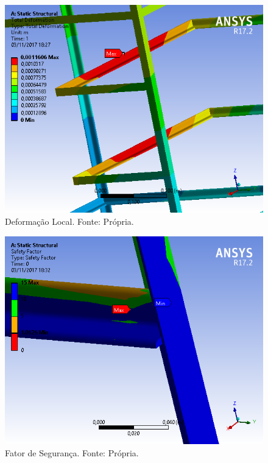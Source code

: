   \begin{figure}[H]
    \centering
    \includegraphics[scale= 0.6]{figuras/estrutura/deformacao-local.png}
    \caption{Deformação Local. Fonte: Própria.}
    \label{modelagem}
  \end{figure}
 
  \begin{figure}[H]
    \centering
    \includegraphics[scale= 0.6]{figuras/estrutura/fator-de-seguranca.png}
    \caption{Fator de Segurança. Fonte: Própria.}
    \label{modelagem}
  \end{figure}

